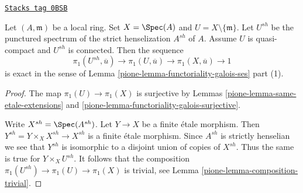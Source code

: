 \begin{lemma}
\label{pione-lemma-local-exact-sequence}
\href{https://stacks.math.columbia.edu/tag/0BSB}{\texttt{Stacks tag 0BSB}}

Let $(A, \mathfrak m)$ be a local ring. Set $X = \Spec(A)$ and
$U = X \setminus \{\mathfrak m\}$. Let $U^{sh}$ be the punctured spectrum
of the strict henselization $A^{sh}$ of $A$.
Assume $U$ is quasi-compact and $U^{sh}$ is connected. Then the sequence
$$
\pi_1(U^{sh}, \overline{u}) \to \pi_1(U, \overline{u}) \to
\pi_1(X, \overline{u}) \to 1
$$
is exact in the sense of Lemma \ref{pione-lemma-functoriality-galois-ses} part (1).
\end{lemma}

\begin{proof}

The map $\pi_1(U) \to \pi_1(X)$ is surjective by
Lemmas \ref{pione-lemma-same-etale-extensions} and
\ref{pione-lemma-functoriality-galois-surjective}.

\medskip\noindent
Write $X^{sh} = \Spec(A^{sh})$. Let $Y \to X$ be a finite \'etale morphism.
Then $Y^{sh} = Y \times_X X^{sh} \to X^{sh}$ is a finite \'etale morphism.
Since $A^{sh}$ is strictly henselian we see that $Y^{sh}$ is isomorphic
to a disjoint union of copies of $X^{sh}$. Thus the same is true for
$Y \times_X U^{sh}$. It follows that the composition
$\pi_1(U^{sh}) \to \pi_1(U) \to \pi_1(X)$ is trivial, see
Lemma \ref{pione-lemma-composition-trivial}.


\end{proof}
